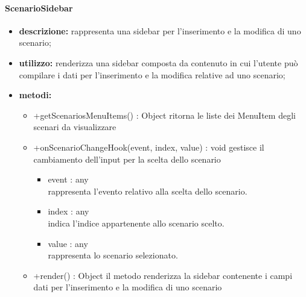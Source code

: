 \paragraph{ScenarioSidebar}
\begin{itemize}
	\item \textbf{descrizione:} rappresenta una sidebar per l'inserimento e la modifica di uno scenario;
	\item \textbf{utilizzo:} renderizza una sidebar composta da contenuto in cui l'utente può compilare i dati per l'inserimento e la modifica relative ad uno scenario;
	\item \textbf{metodi:}
	\begin{itemize}
		\item +getScenariosMenuItems() : Object\newline
		ritorna le liste dei MenuItem degli scenari da visualizzare
		\item +onScenarioChangeHook(event, index, value) : void\newline
		gestisce il cambiamento dell'input per la scelta dello scenario
		\begin{itemize}
			\item event : any\\
			rappresenta l'evento relativo alla scelta dello scenario.
			\item index : any\\
			indica l'indice appartenente allo scenario scelto.
			\item value : any\\
			rappresenta lo scenario selezionato.
		\end{itemize}
		\item +render() : Object\newline
		il metodo renderizza la sidebar contenente i campi dati per l'inserimento e la modifica di uno scenario
	\end{itemize}
\end{itemize}
\newpage
